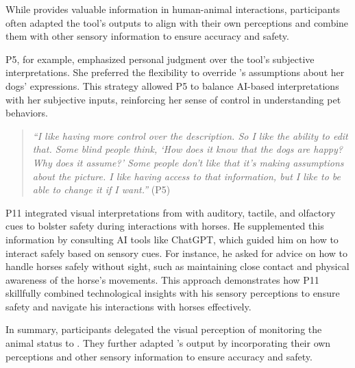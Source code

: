While \bma{} provides valuable information in human-animal interactions, participants often adapted the tool's outputs to align with their own perceptions and combine them with other sensory information to ensure accuracy and safety.


P5, for example, emphasized personal judgment over the tool's subjective interpretations. She preferred the flexibility to override \bma's assumptions about her dogs' expressions. This strategy allowed P5 to balance AI-based interpretations with her subjective inputs, reinforcing her sense of control in understanding pet behaviors.
\begin{quote}
    \textit{``I like having more control over the description. So I like the ability to edit that. Some blind people think, `How does it know that the dogs are happy? Why does it assume?' Some people don't like that it's making assumptions about the picture. I like having access to that information, but I like to be able to change it if I want.''} (P5)
\end{quote}


P11 integrated visual interpretations from \bma{} with auditory, tactile, and olfactory cues to bolster safety during interactions with horses. He supplemented this information by consulting AI tools like ChatGPT, which guided him on how to interact safely based on sensory cues. For instance, he asked for advice on how to handle horses safely without sight, such as maintaining close contact and physical awareness of the horse's movements. This approach demonstrates how P11 skillfully combined technological insights with his sensory perceptions to ensure safety and navigate his interactions with horses effectively.


In summary, participants delegated the visual perception of monitoring the animal status to \bma. They further adapted \bma's output by incorporating their own perceptions and other sensory information to ensure accuracy and safety.







